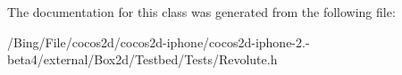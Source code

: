 The documentation for this class was generated from the following file\-:\begin{DoxyCompactItemize}
\item 
/\-Bing/\-File/cocos2d/cocos2d-\/iphone/cocos2d-\/iphone-\/2.-\/beta4/external/\-Box2d/\-Testbed/\-Tests/Revolute.\-h\end{DoxyCompactItemize}
